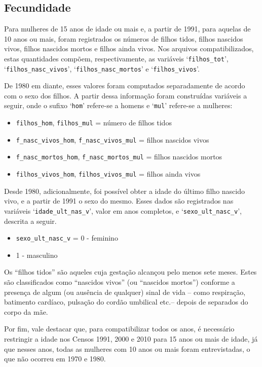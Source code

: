\documentclass[12pt,a4paper]{article}
\newcommand{\vr}[1]{\texttt{#1}}
\begin{document}
\subsection{Fecundidade}\label{sec:d11}
Para mulheres de 15 anos de idade ou mais e, a partir de 1991, para aquelas de 10 anos ou mais, foram registrados os números de filhos tidos, filhos nascidos vivos, filhos nascidos mortos e filhos ainda vivos. Nos arquivos compatibilizados, estas quantidades compõem, respectivamente, as variáveis ‘\vr{filhos\_tot}’, ‘\vr{filhos\_nasc\_vivos}’, ‘\vr{filhos\_nasc\_mortos}’ e ‘\vr{filhos\_vivos}’.

De 1980 em diante, esses valores foram computados separadamente de acordo com o sexo dos filhos. A partir dessa informação foram construídas variáveis a seguir, onde o sufixo ‘\vr{hom}’ refere-se a homens e ‘\vr{mul}’ refere-se a mulheres:
\begin{itemize}
  \item \vr{filhos\_hom}, \vr{filhos\_mul} = número de filhos tidos
  \item \vr{f\_nasc\_vivos\_hom}, \vr{f\_nasc\_vivos\_mul} = filhos nascidos vivos
  \item \vr{f\_nasc\_mortos\_hom}, \vr{f\_nasc\_mortos\_mul} = filhos nascidos mortos
  \item \vr{filhos\_vivos\_hom}, \vr{filhos\_vivos\_mul} = filhos ainda vivos
\end{itemize}

Desde 1980, adicionalmente, foi possível obter a idade do último filho nascido vivo, e a partir de 1991 o sexo do mesmo. Esses dados são registrados nas variáveis ‘\vr{idade\_ult\_nas\_v}’, valor em anos completos, e ‘\vr{sexo\_ult\_nasc\_v}’, descrita a seguir.
\begin{itemize}
  \item \vr{sexo\_ult\_nasc\_v} = 0 - feminino
  \item 1 - masculino
\end{itemize}

Os “filhos tidos” são aqueles cuja gestação alcançou pelo menos sete meses. Estes são classificados como “nascidos vivos” (ou “nascidos mortos”) conforme a presença de algum (ou ausência de qualquer) sinal de vida -- como respiração, batimento cardíaco, pulsação do cordão umbilical etc.-- depois de separados do corpo da mãe.

Por fim, vale destacar que, para compatibilizar todos os anos, é necessário restringir a idade nos Censos 1991, 2000 e 2010 para 15 anos ou mais de idade, já que nesses anos, todas as mulheres com 10 anos ou mais foram entrevistadas, o que não ocorreu em 1970 e 1980.
\end{document}
